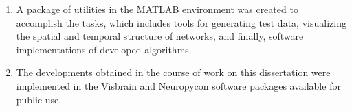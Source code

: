 \begin{enumerate}
  \item A package of utilities in the MATLAB environment was created to accomplish the tasks, which includes tools for generating test data, visualizing the spatial and temporal structure of networks, and finally, software implementations of developed algorithms.
  \item The developments obtained in the course of work on this dissertation were implemented in the Visbrain and Neuropycon software packages available for public use.
\end{enumerate}
